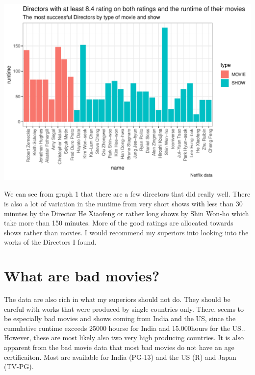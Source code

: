 \documentclass[11pt,preprint, authoryear]{elsarticle}
\let\origfigure\figure
\let\endorigfigure\endfigure
\renewenvironment{figure}[1][2] {
    \expandafter\origfigure\expandafter[H]
} {
    \endorigfigure
}
\numberwithin{equation}{section}
\numberwithin{figure}{section}
\numberwithin{table}{section}
\begin{document}
\begin{figure}[H]

{\centering \includegraphics{Q4_files/figure-latex/unnamed-chunk-3-1} 

}

\caption{Good movies.\label{Figure1}}\label{fig:unnamed-chunk-3}
\end{figure}

We can see from graph 1 that there are a few directors that did really
well. There is also a lot of variation in the runtime from very short
shows with less than 30 minutes by the Director He Xiaofeng or rather
long shows by Shin Won-ho which take more than 150 minutes. More of the
good ratings are allocated towards shows rather than movies. I would
recommend my superiors into looking into the works of the Directors I
found.

\hypertarget{what-are-bad-movies}{%
\section{What are bad movies?}\label{what-are-bad-movies}}

The data are also rich in what my superiors should not do. They should
be careful with works that were produced by single countries only.
There, seems to be especially bad movies and shows coming from India and
the US, since the cumulative runtime exceeds 25000 hourse for India and
15.000hours for the US.. However, these are most likely also two very
high producing countries. It is also apparent from the bad movie data
that most bad movies do not have an age certificaiton. Most are
available for India (PG-13) and the US (R) and Japan (TV-PG).
\end{document}
